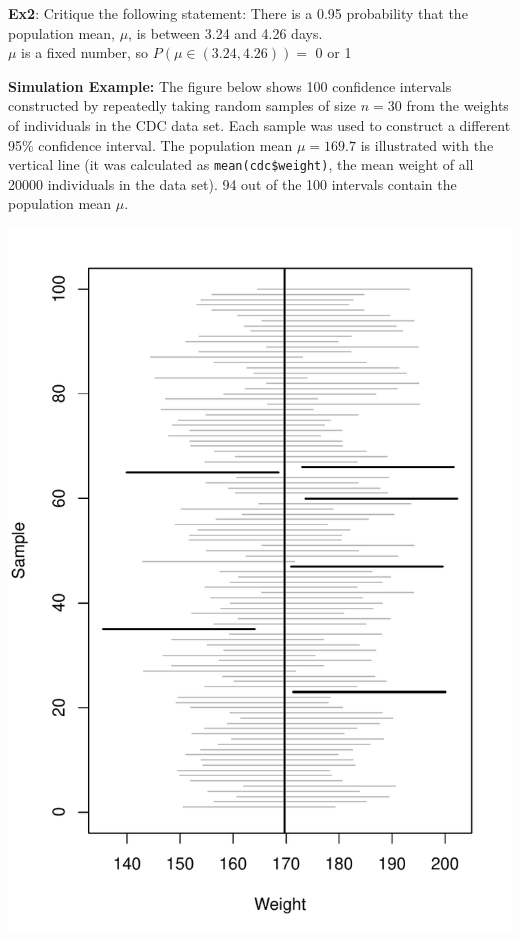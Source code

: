 \documentclass[fleqn, 11pt]{article}\usepackage[]{graphicx}\usepackage[]{color}
\makeatletter
\def\maxwidth{ %
  \ifdim\Gin@nat@width>\linewidth
    \linewidth
  \else
    \Gin@nat@width
  \fi
}
\newenvironment{knitrout}{}{} %
\makeatother
\begin{document}
\textbf{Ex2}:  Critique the following statement:  There is a 0.95 probability that the population mean, $\mu$, is between 3.24 and 4.26 days.\\

{\color{blue}
$\mu$ is a fixed number, so $P(\mu \in (3.24, 4.26)) =$ 0 or 1
}

\clearpage

\clearpage
\textbf{Simulation Example:}  The figure below shows 100 confidence intervals constructed by repeatedly taking random samples of size $n=30$ from the weights of individuals in the CDC data set.  Each sample was used to construct a different 95\% confidence interval.  The population mean $\mu = 169.7$ is illustrated with the vertical line (it was calculated as \texttt{mean(cdc\$weight)}, the mean weight of all 20000 individuals in the data set).  94 out of the 100 intervals contain the population mean $\mu$.

\begin{knitrout}
\color{fgcolor}
\includegraphics[width=\maxwidth]{figure/unnamed-chunk-1-1} 
\end{knitrout}
\end{document}

